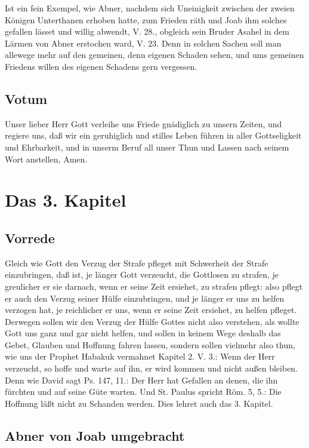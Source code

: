 Ist ein fein Exempel, wie Abner, nachdem sich Uneinigkeit zwischen der zweien Königen Unterthanen erhoben hatte, zum Frieden räth und Joab ihm solches gefallen lässet und willig abwendt, V. 28., obgleich sein Bruder Asahel in dem Lärmen von Abner erstochen ward, V. 23. Denn in solchen Sachen soll man allewege mehr auf den gemeinen, denn eigenen Schaden sehen, und ums gemeinen Friedens willen des eigenen Schadens gern vergessen.

\section{Votum}

Unser lieber Herr Gott verleihe uns Friede gnädiglich zu unsern Zeiten, und regiere uns, daß wir ein geruhiglich und stilles Leben führen in aller Gottseligkeit und Ehrbarkeit, und in unserm Beruf all unser Thun und Lassen nach seinem Wort anstellen, Amen.

\chapter{Das 3. Kapitel}

\section{Vorrede}

Gleich wie Gott den Verzug der Strafe pfleget mit Schwerheit der Strafe einzubringen, daß ist, je länger Gott verzeucht, die Gottlosen zu strafen, je greulicher er sie darnach, wenn er seine Zeit ersiehet, zu strafen pflegt: also pflegt er auch den Verzug seiner Hülfe einzubringen, und je länger er uns zu helfen verzogen hat, je reichlicher er uns, wenn er seine Zeit ersiehet, zu helfen pfleget. Derwegen sollen wir den Verzug der Hülfe Gottes nicht also verstehen, als wollte Gott uns ganz und gar nicht helfen, und sollen in keinem Wege deshalb das Gebet, Glauben und Hoffnung fahren lassen, sondern sollen vielmehr also thun, wie uns der Prophet Habakuk vermahnet Kapitel 2. V. 3.: Wenn der Herr verzeucht, so hoffe und warte auf ihn, er wird kommen und nicht außen bleiben. Denn wie David sagt Ps. 147, 11.: Der Herr hat Gefallen an denen, die ihn fürchten und auf seine Güte warten. Und St. Paulus spricht Röm. 5, 5.: Die Hoffnung läßt nicht zu Schanden werden. Dies lehret auch das 3. Kapitel.

\section{Abner von Joab umgebracht}

